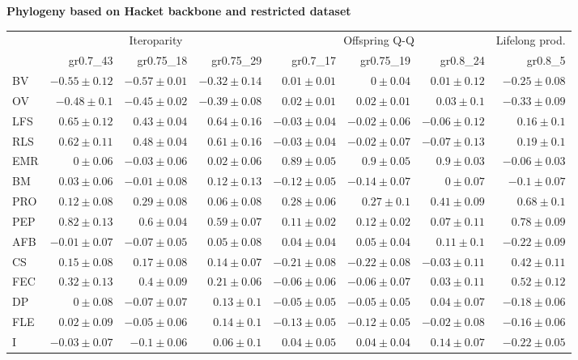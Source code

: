 \begin{landscape}
\begin{table}
\begin{footnotesize}
\textbf{Phylogeny based on Hacket backbone and restricted dataset}

\begin{tabular}{@{}l|rrr|rrr|r@{}}
\toprule
 & \multicolumn{3}{c|}{Iteroparity} & \multicolumn{3}{c|}{Offspring Q-Q} & \multicolumn{1}{c}{Lifelong prod.}\\
 & gr0.7\_43 & gr0.75\_18 & gr0.75\_29 & gr0.7\_17 & gr0.75\_19 & gr0.8\_24 & gr0.8\_5\\
\midrule
BV & $-0.55 \pm 0.12$ & $-0.57 \pm 0.01$ & $-0.32 \pm 0.14$ & $0.01 \pm 0.01$ & $0 \pm 0.04$ & $0.01 \pm 0.12$ & $-0.25 \pm 0.08$\\
OV & $-0.48 \pm 0.1$ & $-0.45 \pm 0.02$ & $-0.39 \pm 0.08$ & $0.02 \pm 0.01$ & $0.02 \pm 0.01$ & $0.03 \pm 0.1$ & $-0.33 \pm 0.09$\\
LFS & $0.65 \pm 0.12$ & $0.43 \pm 0.04$ & $0.64 \pm 0.16$ & $-0.03 \pm 0.04$ & $-0.02 \pm 0.06$ & $-0.06 \pm 0.12$ & $0.16 \pm 0.1$\\
RLS & $0.62 \pm 0.11$ & $0.48 \pm 0.04$ & $0.61 \pm 0.16$ & $-0.03 \pm 0.04$ & $-0.02 \pm 0.07$ & $-0.07 \pm 0.13$ & $0.19 \pm 0.1$\\
EMR & $0 \pm 0.06$ & $-0.03 \pm 0.06$ & $0.02 \pm 0.06$ & $0.89 \pm 0.05$ & $0.9 \pm 0.05$ & $0.9 \pm 0.03$ & $-0.06 \pm 0.03$\\
BM & $0.03 \pm 0.06$ & $-0.01 \pm 0.08$ & $0.12 \pm 0.13$ & $-0.12 \pm 0.05$ & $-0.14 \pm 0.07$ & $0 \pm 0.07$ & $-0.1 \pm 0.07$\\
PRO & $0.12 \pm 0.08$ & $0.29 \pm 0.08$ & $0.06 \pm 0.08$ & $0.28 \pm 0.06$ & $0.27 \pm 0.1$ & $0.41 \pm 0.09$ & $0.68 \pm 0.1$\\
PEP & $0.82 \pm 0.13$ & $0.6 \pm 0.04$ & $0.59 \pm 0.07$ & $0.11 \pm 0.02$ & $0.12 \pm 0.02$ & $0.07 \pm 0.11$ & $0.78 \pm 0.09$\\
AFB & $-0.01 \pm 0.07$ & $-0.07 \pm 0.05$ & $0.05 \pm 0.08$ & $0.04 \pm 0.04$ & $0.05 \pm 0.04$ & $0.11 \pm 0.1$ & $-0.22 \pm 0.09$\\
CS & $0.15 \pm 0.08$ & $0.17 \pm 0.08$ & $0.14 \pm 0.07$ & $-0.21 \pm 0.08$ & $-0.22 \pm 0.08$ & $-0.03 \pm 0.11$ & $0.42 \pm 0.11$\\
FEC & $0.32 \pm 0.13$ & $0.4 \pm 0.09$ & $0.21 \pm 0.06$ & $-0.06 \pm 0.06$ & $-0.06 \pm 0.07$ & $0.03 \pm 0.11$ & $0.52 \pm 0.12$\\
DP & $0 \pm 0.08$ & $-0.07 \pm 0.07$ & $0.13 \pm 0.1$ & $-0.05 \pm 0.05$ & $-0.05 \pm 0.05$ & $0.04 \pm 0.07$ & $-0.18 \pm 0.06$\\
FLE & $0.02 \pm 0.09$ & $-0.05 \pm 0.06$ & $0.14 \pm 0.1$ & $-0.13 \pm 0.05$ & $-0.12 \pm 0.05$ & $-0.02 \pm 0.08$ & $-0.16 \pm 0.06$\\
I & $-0.03 \pm 0.07$ & $-0.1 \pm 0.06$ & $0.06 \pm 0.1$ & $0.04 \pm 0.05$ & $0.04 \pm 0.04$ & $0.14 \pm 0.07$ & $-0.22 \pm 0.05$\\
\bottomrule
\end{tabular}

\end{footnotesize}
\end{table}
\end{landscape}


